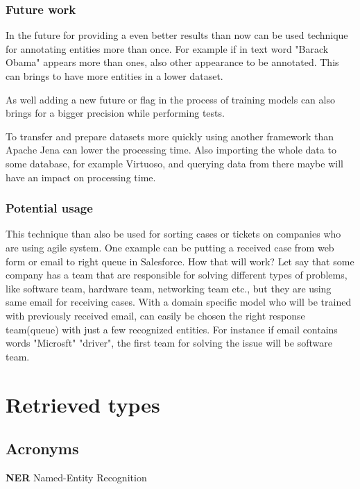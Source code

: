 \documentclass[thesis=M,english]{FITthesis}[2018/05/30]
\begin{document}
\begin{conclusion}
\subsection{Future work}
	
	 In the future for providing a even better results than now can be used technique for annotating entities more than once. For example if in text word "Barack Obama" appears more than ones, also other appearance to be annotated. This can brings to have more entities in a lower dataset.
	 
	 As well adding a new future or flag in the process of training models can also brings for a bigger precision while performing tests. 
	 
	 To transfer and prepare datasets more quickly using another framework than Apache Jena can lower the processing time. Also importing the whole data to some database, for example Virtuoso, and querying data from there maybe will have an impact on processing time.


\end{conclusion}

\subsection{Potential usage}

	This technique than also be used for sorting cases or tickets on companies who are using agile system. One example can be putting a received case from web form or email to right queue in Salesforce. How that will work? Let say that some company has a team that are responsible for solving different types of problems, like software team, hardware team, networking team etc., but they are using same email for receiving cases. With a domain specific model who will be trained with previously received email, can easily be chosen the right response team(queue) with just a few recognized entities. For instance if email contains words "Microsft" "driver", the first team for solving the issue will be software team.





\appendix
\chapter{Retrieved types}

\section{Acronyms}
\textbf{NER} Named-Entity Recognition
\end{document}
